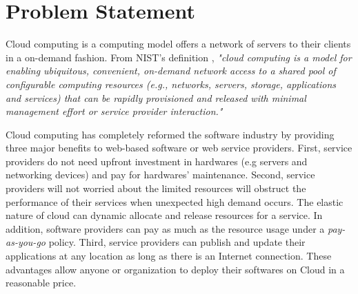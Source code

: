 \section{Problem Statement}



Cloud computing is a computing model offers a network of servers to their 
clients in a on-demand fashion. From NIST's definition \cite{Mell:2011jj}, \textit{"cloud computing is a model for enabling ubiquitous, convenient, on-demand network access to a shared pool of configurable computing resources (e.g., networks, servers, storage, applications and services) that can be rapidly provisioned and released with minimal management effort or service provider interaction."}

Cloud computing has completely reformed the software industry \cite{Buyya:2009ix} by providing three major benefits to web-based software or web service providers.
First, service providers do not need upfront investment in hardwares (e.g servers and networking devices) and pay for hardwares' maintenance. 
Second, service providers will not worried about the limited resources will obstruct the performance of their services when unexpected high demand occurs. The elastic nature of cloud can dynamic allocate and release resources for a service. In addition, software providers can pay as much as the resource usage under a \emph{pay-as-you-go} policy.
Third, service providers can publish and update their applications at any location 
as long as there is an Internet connection. 
These advantages allow anyone or organization to deploy their softwares on Cloud in
a reasonable price. 

